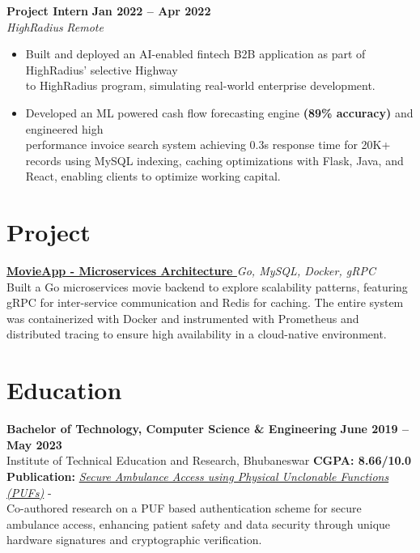 \documentclass[a4paper,12pt]{article}
\newenvironment{experience}[4]
{%
    \noindent\textbf{#1} \hfill \textbf{#2} \\
    \textit{#3} \hfill \textit{#4} 
    \begin{itemize}[nosep, leftmargin=1.2em, itemsep=1pt, label=$\bullet$]
}
{%
    \end{itemize}
}
\newenvironment{project}[2]
  {
    \noindent\textbf{#1} \hfill \textit{#2}\\[2pt] %
  }
  {}
\begin{document}
\begin{experience}
  {Project Intern}                        %
  {Jan 2022 -- Apr 2022}                  %
  {HighRadius}                            %
  {Remote}                                %
    \item Built and deployed an AI-enabled fintech B2B application as part of HighRadius’ selective Highway\\to HighRadius program, simulating real-world enterprise development.
    \item Developed an ML powered cash flow forecasting engine \textbf{(89\% accuracy)} and engineered high\\performance invoice search system achieving 0.3s response time for 20K+ records using MySQL indexing, caching optimizations with Flask, Java, and React, enabling clients to optimize working capital.
\end{experience}
  
\section{Project}
\begin{project}
    {\href{https://github.com/abhishek622/movieapp}{MovieApp - Microservices Architecture \raisebox{-0.05\height}\faGithub}}
    {Go, MySQL, Docker, gRPC}
    Built a Go microservices movie backend to explore scalability patterns, featuring gRPC for inter-service communication and Redis for caching. The entire system was containerized with Docker and instrumented with Prometheus and distributed tracing to ensure high availability in a cloud-native environment.
\end{project}

\section{Education}
\textbf{Bachelor of Technology, Computer Science \& Engineering} \hfill \textbf{June 2019 -- May 2023} \\
Institute of Technical Education and Research, Bhubaneswar \hfill \textbf{CGPA: 8.66/10.0} \\
\textbf{Publication:} \href{https://ieeexplore.ieee.org/abstract/document/11063984}{\textit{Secure Ambulance Access using Physical Unclonable Functions (PUFs)}} - \\Co-authored research on a PUF based authentication scheme for secure ambulance access, enhancing patient safety and data security through unique hardware signatures and cryptographic verification.
\end{document}
